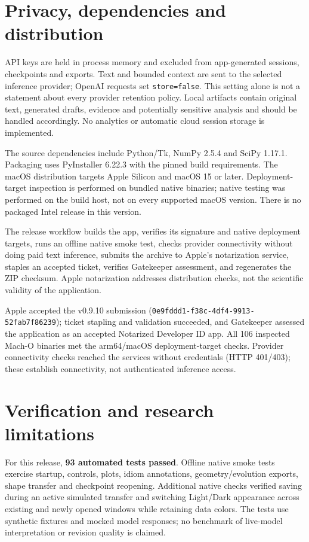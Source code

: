 \documentclass[manuscript,screen,nonacm]{acmart}
\begin{document}
\section{Privacy, dependencies and
distribution}\label{privacy-dependencies-and-distribution}

API keys are held in process memory and excluded from app-generated
sessions, checkpoints and exports. Text and bounded context are sent to
the selected inference provider; OpenAI requests set
\nolinkurl{store=false}. This setting alone is not a statement about every
provider retention policy. Local artifacts contain original text,
generated drafts, evidence and potentially sensitive analysis and should
be handled accordingly. No analytics or automatic cloud session storage
is implemented.

The source dependencies include Python/Tk, NumPy 2.5.4 and SciPy 1.17.1.
Packaging uses PyInstaller 6.22.3 with the pinned build requirements.
The macOS distribution targets Apple Silicon and macOS 15 or later.
Deployment-target inspection is performed on bundled native binaries;
native testing was performed on the build host, not on every supported
macOS version. There is no packaged Intel release in this version.

The release workflow builds the app, verifies its signature and native
deployment targets, runs an offline native smoke test, checks provider
connectivity without doing paid text inference, submits the archive to
Apple's notarization service, staples an accepted ticket, verifies
Gatekeeper assessment, and regenerates the ZIP checksum. Apple
notarization addresses distribution checks, not the scientific validity
of the application.

Apple accepted the v0.9.10 submission
(\nolinkurl{0e9fddd1-f38c-4df4-9913-52fab7f86239}); ticket stapling and
validation succeeded, and Gatekeeper assessed the application as an
accepted Notarized Developer ID app. All 106 inspected Mach-O binaries
met the arm64/macOS deployment-target checks. Provider connectivity
checks reached the services without credentials (HTTP 401/403); these
establish connectivity, not authenticated inference access.

\section{Verification and research
limitations}\label{verification-and-research-limitations}

For this release, \textbf{93 automated tests passed}. Offline native
smoke tests exercise startup, controls, plots, idiom annotations,
geometry/evolution exports, shape transfer and checkpoint reopening.
Additional native checks verified saving during an active simulated
transfer and switching Light/Dark appearance across existing and newly
opened windows while retaining data colors. The tests use synthetic
fixtures and mocked model responses; no benchmark of live-model
interpretation or revision quality is claimed.
\end{document}
